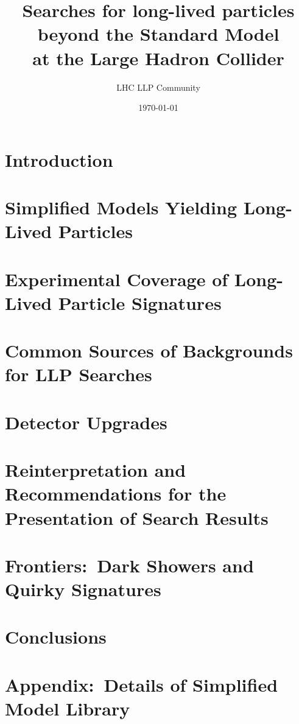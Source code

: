 \documentclass[a4paper,notitlepage,nobib]{tufte-book}
\title{Searches for long-lived particles beyond the Standard Model \\ \smallskip \noindent at the Large Hadron Collider}
\author{LHC LLP Community}
\date{\today}
\begin{document}
\setcounter{secnumdepth}{3} %



\setcounter{tocdepth}{1}
\tableofcontents





\chapter{Introduction}
\label{sec:Introduction}


\chapter{Simplified Models Yielding Long-Lived Particles}
\label{sec:simplifiedmodel}


\chapter{Experimental Coverage of Long-Lived Particle Signatures}
\label{sec:experimentcoverage}


\chapter{Common Sources of Backgrounds for LLP Searches}
\label{sec:backgrounds}


\chapter{Detector Upgrades}
\label{sec:triggers}


\chapter{Reinterpretation and Recommendations for the Presentation of Search Results}
\label{sec:reint}









\chapter{Frontiers:~Dark Showers and Quirky Signatures}
\label{sec:showers}


\chapter{Conclusions}
\label{sec:conclusions}


\appendix

\chapter{Appendix:~Details of Simplified Model Library}
\label{sec:library_more}


\printbibliography
\end{document}
